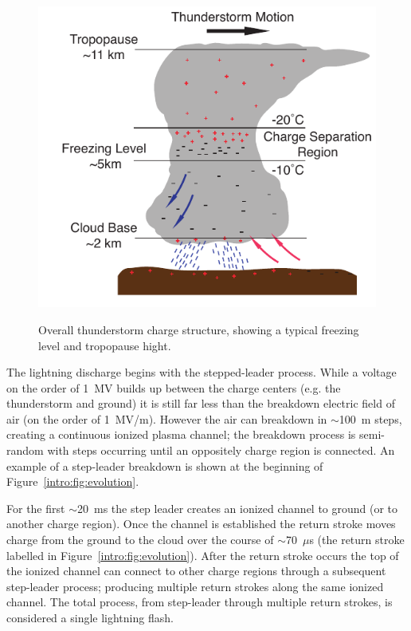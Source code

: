 \begin{figure}[ht!]
	\centering
	\includegraphics[scale=1]{Introduction/Figures/thunderstorm_structure.pdf}\\
	\caption{Overall thunderstorm charge structure, showing a typical freezing level and tropopause hight.}
	\label{intro:fig:thunderstorm}
\end{figure}

The lightning discharge begins with the stepped-leader process.
While a voltage on the order of 1~MV builds up between the charge centers (e.g. the thunderstorm and ground) it is still far less than the breakdown electric field of air (on the order of 1~MV/m).
However the air can breakdown in $\sim$100~m steps, creating a continuous ionized plasma channel; the breakdown process is semi-random with steps occurring until an oppositely charge region is connected.
An example of a step-leader breakdown is shown at the beginning of Figure~\ref{intro:fig:evolution}.

For the first $\sim$20~ms the step leader creates an ionized channel to ground (or to another charge region).
Once the channel is established the return stroke moves charge from the ground to the cloud over the course of $\sim$70~$\mu$s (the return stroke labelled in Figure~\ref{intro:fig:evolution}).
After the return stroke occurs the top of the ionized channel can connect to other charge regions through a subsequent step-leader process; producing multiple return strokes along the same ionized channel.
The total process, from step-leader through multiple return strokes, is considered a single lightning flash.

